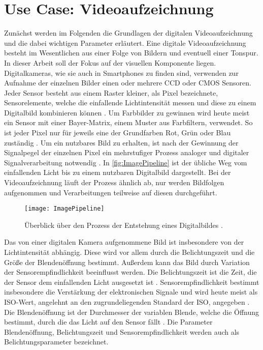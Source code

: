 \chapter{Use Case: Videoaufzeichnung}
\label{ch:videoaufzeichnung}

Zunächst werden im Folgenden die Grundlagen der digitalen Videoaufzeichnung und die dabei wichtigen Parameter erläutert.
Eine digitale Videoaufzeichnung besteht im Wesentlichen aus einer Folge von Bildern und eventuell einer Tonspur.
In dieser Arbeit soll der Fokus auf der visuellen Komponente liegen.
Digitalkameras, wie sie auch in Smartphones zu finden sind, verwenden zur Aufnahme der einzelnen Bilder einen oder mehrere \ac{CCD} oder \ac{CMOS} Sensoren.
Jeder Sensor besteht aus einem Raster kleiner, als Pixel bezeichnete, Sensorelemente, welche die einfallende Lichtintensität messen und diese zu einem Digitalbild kombinieren können \cite[S. 63ff.]{Szeliski_ComputerVision}.
Um Farbbilder zu gewinnen wird heute meist ein Sensor mit einer Bayer-Matrix, einem Muster aus Farbfiltern, verwendet.
So ist jeder Pixel nur für jeweils eine der Grundfarben Rot, Grün oder Blau zuständig \cite[S. 420ff.]{Schmidt_Videotechnik}.
Um ein nutzbares Bild zu erhalten, ist nach der Gewinnung der Signalpegel der einzelnen Pixel ein mehrstufiger Prozess analoger und digitaler Signalverarbeitung notwendig \cite[S. 63ff.]{Szeliski_ComputerVision}.
In \autoref{fig:ImagePipeline} ist der übliche Weg vom einfallenden Licht bis zu einem nutzbaren Digitalbild dargestellt. 
Bei der Videoaufzeichnung läuft der Prozess ähnlich ab, nur werden Bildfolgen aufgenommen und Verarbeitungen teilweise auf diesen durchgeführt.
\begin{figure}
    \centering
    \texttt{[image: ImagePipeline]}
    \caption{Überblick über den Prozess der Entstehung eines Digitalbildes \cite[S. 64ff.]{Szeliski_ComputerVision}.}
    \label{fig:ImagePipeline}
\end{figure}


Das von einer digitalen Kamera aufgenommene Bild ist insbesondere von der Lichtintensität abhängig.
Diese wird vor allem durch die Belichtungszeit und die Größe der Blendenöffnung bestimmt.
Außerdem kann das Bild durch Variation der Sensorempfindlichkeit beeinflusst werden.
Die Belichtungszeit ist die Zeit, die der Sensor dem einfallenden Licht ausgesetzt ist \cite[S. 390ff.]{Schmidt_Videotechnik}.
Sensorempfindlichkeit bestimmt insbesondere die Verstärkung der elektronischen Signale und wird heute meist als \acs{ISO}-Wert, angelehnt an den zugrundeliegenden Standard der \acf{ISO}, angegeben \cite[S. 412ff.]{Schmidt_Videotechnik}.
Die Blendenöffnung ist der Durchmesser der variablen Blende, welche die Öffnung bestimmt, durch die das Licht auf den Sensor fällt \cite[S. 444ff.]{Schmidt_Videotechnik}.
Die Parameter Blendenöffnung, Belichtungszeit und Sensorempfindlichkeit werden auch als Belichtungsparameter bezeichnet.

